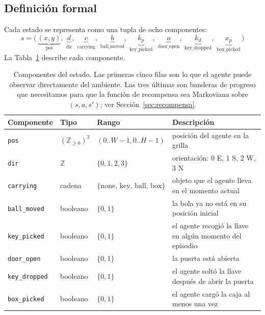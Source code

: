 \documentclass[11pt,a4paper]{article}
\begin{document}
\subsection{Definición formal}

Cada estado se representa como una tupla de ocho componentes:
\begin{equation}
  s = \big(\,
    \underbrace{(x,y)}_{\text{pos}},\;
    \underbrace{d}_{\text{dir}},\;
    \underbrace{c}_{\text{carrying}},\;
    \underbrace{b}_{\text{ball\_moved}},\;
    \underbrace{k_p}_{\text{key\_picked}},\;
    \underbrace{o}_{\text{door\_open}},\;
    \underbrace{k_d}_{\text{key\_dropped}},\;
    \underbrace{x_p}_{\text{box\_picked}}
  \,\big)
  \label{eq:state}
\end{equation}
La Tabla~\ref{tab:state} describe cada componente.

\begin{table}[h]
  \centering
  \small
  \setlength{\extrarowheight}{2pt}
  \begin{tabularx}{\linewidth}{l l l X}
    \toprule
    \textbf{Componente} & \textbf{Tipo} & \textbf{Rango} & \textbf{Descripción} \\
    \midrule
    \texttt{pos}          & \((\mathbb{Z}_{\ge 0})^2\) & \((0..W{-}1, 0..H{-}1)\) & posición del agente en la grilla \\
    \texttt{dir}          & \(\mathbb{Z}\) & \(\{0,1,2,3\}\) & orientación: 0 E, 1 S, 2 W, 3 N \\
    \texttt{carrying}     & cadena & \(\{\text{none, key, ball, box}\}\) & objeto que el agente lleva en el momento actual \\
    \texttt{ball\_moved}  & booleano & \(\{0,1\}\) & la bola ya no está en su posición inicial \\
    \texttt{key\_picked}  & booleano & \(\{0,1\}\) & el agente recogió la llave en algún momento del episodio \\
    \texttt{door\_open}   & booleano & \(\{0,1\}\) & la puerta está abierta \\
    \texttt{key\_dropped} & booleano & \(\{0,1\}\) & el agente soltó la llave después de abrir la puerta \\
    \texttt{box\_picked}  & booleano & \(\{0,1\}\) & el agente cargó la caja al menos una vez \\
    \bottomrule
  \end{tabularx}
  \caption{Componentes del estado. Las primeras cinco filas son lo que el
  agente puede observar directamente del ambiente. Las tres últimas son
  banderas de progreso que necesitamos para que la función de recompensa
  sea Markoviana sobre \((s, a, s')\); ver Sección~\ref{sec:recompensa}.}
  \label{tab:state}
\end{table}
\end{document}
